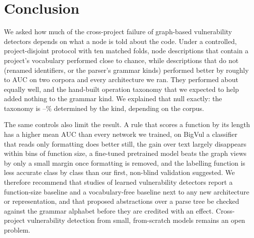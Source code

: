 \section{Conclusion}
\label{sec:conclusion}

We asked how much of the cross-project failure of graph-based vulnerability
detectors depends on what a node is told about the code. Under a controlled,
project-disjoint protocol with ten matched folds, node descriptions that contain
a project's vocabulary performed close to chance, while descriptions that do
not (renamed identifiers, or the parser's grammar kinds) performed better by
roughly \numdeltaMin{} to \numdeltaMax{} AUC on two corpora and every architecture we ran. They performed
about equally well, and the hand-built operation taxonomy that we expected to
help added nothing to the grammar kind. We explained that null exactly: the
taxonomy is \numdeterminismMin{}--\numdeterminismMax{}\% determined by the kind, depending on the corpus.

The same controls also limit the result. A rule that scores a function by its
length has a higher mean AUC than every network we trained, on BigVul a
classifier that reads only formatting does better still, the gain over text largely
disappears within bins of function size, a fine-tuned pretrained model beats the graph views by only a small margin
once formatting is removed, and the labelling function is less accurate class by class than
our first, non-blind validation suggested. We therefore recommend that studies
of learned vulnerability detectors report a function-size baseline and a
vocabulary-free baseline next to any new architecture or representation, and
that proposed abstractions over a parse tree be checked against the grammar
alphabet before they are credited with an effect. Cross-project vulnerability
detection from small, from-scratch models remains an open problem.
